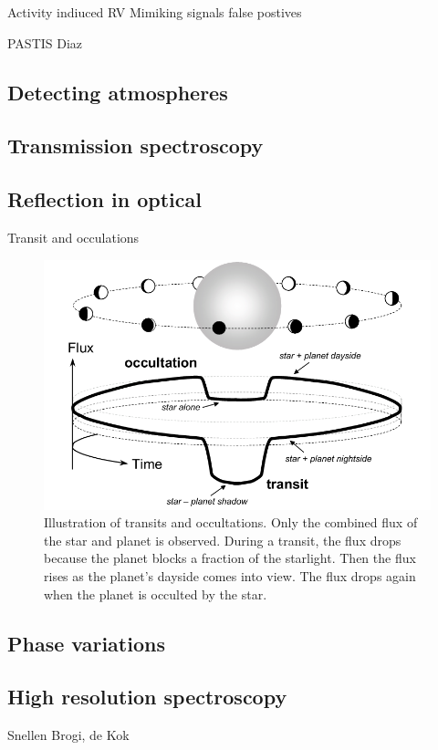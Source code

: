 Activity indiuced RV
Mimiking signals false postives

PASTIS Diaz



\subsection{Detecting atmospheres}

\subsection{Transmission spectroscopy}

\subsection{Reflection in optical}

Transit and occulations \citet{winn_transits_2010}


\begin{figure}
    \centering
    \includegraphics[width=0.6\linewidth]{./figures/introduction/circular_diagram.png}
    \caption{Illustration of transits and occultations. Only the combined flux of the star and planet is observed. During a transit, the flux
        drops because the planet blocks a fraction of the starlight. Then the flux rises as the planet’s dayside comes into view. The flux drops
        again when the planet is occulted by the star. \citet{winn_transits_2010}}
    \label{fig:transits_and_occultations}
\end{figure}

\subsection{Phase variations}

\subsection{High resolution spectroscopy}
Snellen  Brogi, de Kok

